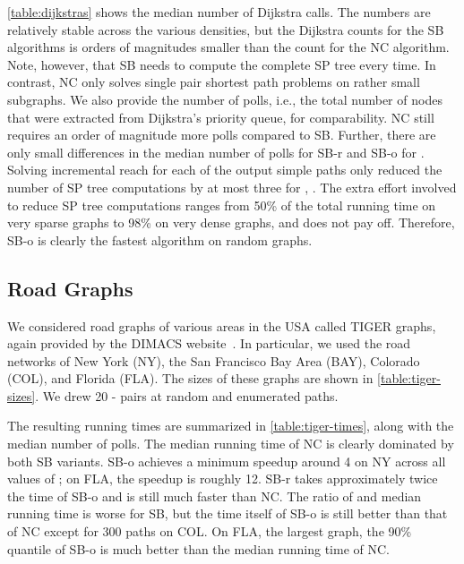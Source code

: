 \documentclass[runningheads,a4paper]{llncs}
\begin{document}
\autoref{table:dijkstras} shows the median number of Dijkstra calls.
The numbers are relatively stable across the various densities, but the Dijkstra counts for the SB algorithms is orders of magnitudes smaller than the count for the NC algorithm.
Note, however, that SB needs to compute the complete SP tree every time.
In contrast, NC only solves single pair shortest path problems on rather small subgraphs.
We also provide the number of polls, i.e.,  the total number of nodes that were extracted from Dijkstra's priority queue, for comparability.
NC still requires an order of magnitude more polls compared to SB.
Further, there are only small differences in the median number of polls for SB-r and SB-o for .
Solving incremental reach for each of the  output simple paths only reduced the number of SP tree computations by at most three for , .
The extra effort involved to reduce SP tree computations ranges from 50\% of the total running time on very sparse graphs to 98\% on very dense graphs, and does not pay off.
Therefore, SB-o is clearly the fastest algorithm on random graphs.

\subsection{Road Graphs}
\label{sec:road-graphs}

We considered road graphs of various areas in the USA called TIGER graphs, again provided by the DIMACS website~\cite{CUSTUM:dimacs9}.
In particular, we used the road networks of New York (NY), the San Francisco Bay Area (BAY), Colorado (COL), and Florida (FLA).
The sizes of these graphs are shown in \autoref{table:tiger-sizes}.
We drew 20 - pairs at random and enumerated  paths.

The resulting running times are summarized in \autoref{table:tiger-times}, along with the median number of polls.
The median running time of NC is clearly dominated by both SB variants.
SB-o achieves a minimum speedup around 4 on NY across all values of ; on FLA, the speedup is roughly 12.
SB-r takes approximately twice the time of SB-o and is still much faster than NC.
The ratio of  and median running time is worse for SB, but the  time itself of SB-o is still better than that of NC except for 300 paths on COL.
On FLA, the largest graph, the 90\% quantile of SB-o is much better than the median running time of NC.




\appendix
\end{document}
